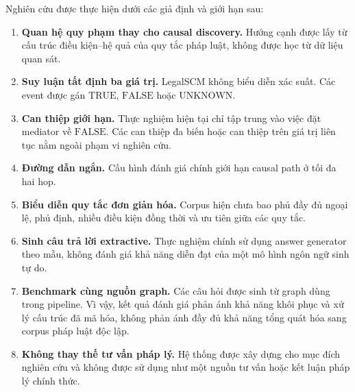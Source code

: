 Nghiên cứu được thực hiện dưới các giả định và giới hạn sau:

\begin{enumerate}
    \item \textbf{Quan hệ quy phạm thay cho causal discovery.}
    Hướng cạnh được lấy từ cấu trúc điều kiện--hệ quả của quy tắc pháp luật,
    không được học từ dữ liệu quan sát.

    \item \textbf{Suy luận tất định ba giá trị.}
    LegalSCM không biểu diễn xác suất. Các event được gán
    \(\mathrm{TRUE}\), \(\mathrm{FALSE}\) hoặc \(\mathrm{UNKNOWN}\).

    \item \textbf{Can thiệp giới hạn.}
    Thực nghiệm hiện tại chỉ tập trung vào việc đặt mediator về
    \(\mathrm{FALSE}\). Các can thiệp đa biến hoặc can thiệp trên giá trị
    liên tục nằm ngoài phạm vi nghiên cứu.

    \item \textbf{Đường dẫn ngắn.}
    Cấu hình đánh giá chính giới hạn causal path ở tối đa hai hop.

    \item \textbf{Biểu diễn quy tắc đơn giản hóa.}
    Corpus hiện chưa bao phủ đầy đủ ngoại lệ, phủ định, nhiều điều kiện đồng
    thời và ưu tiên giữa các quy tắc.

    \item \textbf{Sinh câu trả lời extractive.}
    Thực nghiệm chính sử dụng answer generator theo mẫu, không đánh giá khả
    năng diễn đạt của một mô hình ngôn ngữ sinh tự do.

    \item \textbf{Benchmark cùng nguồn graph.}
    Các câu hỏi được sinh từ graph dùng trong pipeline. Vì vậy, kết quả đánh
    giá phản ánh khả năng khôi phục và xử lý cấu trúc đã mã hóa, không phản
    ánh đầy đủ khả năng tổng quát hóa sang corpus pháp luật độc lập.

    \item \textbf{Không thay thế tư vấn pháp lý.}
    Hệ thống được xây dựng cho mục đích nghiên cứu và không được sử dụng như
    một nguồn tư vấn hoặc kết luận pháp lý chính thức.
\end{enumerate}
